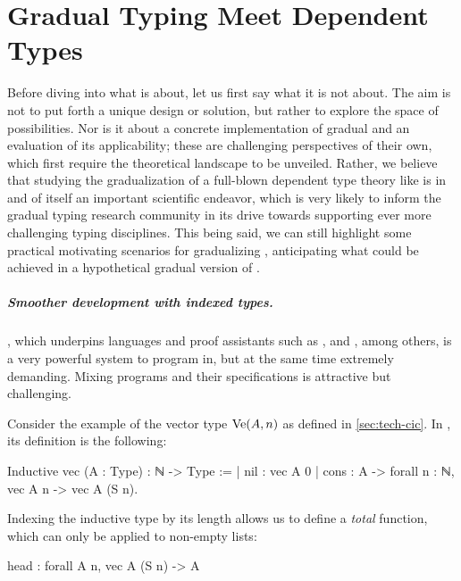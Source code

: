\chapter{Gradual Typing Meet Dependent Types}
\label{chap:gradual-dependent}

\margintoc

Before diving into what  is about, let us first say what it is not about.
The aim is not to put forth a unique design or solution,
but rather to explore the space of possibilities.
Nor is it about a concrete implementation of gradual  and an evaluation of its
applicability; these are challenging perspectives of their own,
which first require the theoretical landscape to be unveiled.
Rather, we believe that studying the gradualization of a full-blown dependent type theory
like  is in and of itself an important scientific endeavor,
which is very likely to inform the gradual typing research community in its drive towards
supporting ever more challenging typing disciplines.
This being said, we can still highlight some practical motivating scenarios
for gradualizing ,
anticipating what could be achieved in a hypothetical gradual version of \eg {}.

\paragraph{Smoother development with indexed types.}
  \label{ex:indices}
  
, which underpins languages and proof assistants such as ,
 and , among others, is a very powerful system to program in,
but at the same time extremely demanding.
Mixing programs and their specifications is attractive but challenging.

Consider the example of the vector type $\operatorname{Ve}(A,n)$ as defined in \cref{sec:tech-cic}.
In , its definition is the following:

\begin{coqcode}
Inductive vec (A : Type) : ℕ -> Type :=
| nil  : vec A 0
| cons : A -> forall n : ℕ, vec A n -> vec A (S n).
\end{coqcode}

Indexing the inductive type by its length allows us to define a \emph{total}
 function, which can only be applied to non-empty lists:
\begin{coqcode}
  head : forall A n, vec A (S n) -> A
\end{coqcode}
  
